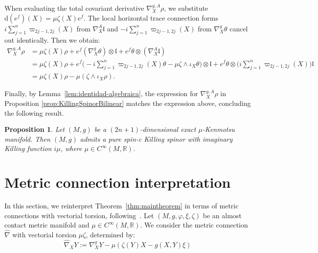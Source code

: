 \documentclass[10pt,a4paper,twoside,reqno]{amsart}
\theoremstyle{plain}
\newtheorem{prop}[thm]{Proposition}
\theoremstyle{definition}
\theoremstyle{remark}
\def\R{\mathbb{R}}
\def\dd{\mathrm{d}}
\def\R{\mathbb{R}}
\def\dd{\mathrm{d}}
\begin{document}
\noindent
When evaluating the total covariant derivative $\nabla^{g,A}_X \rho$, we substitute $\dd(e^f)(X) = \mu\zeta(X)e^f$. The local horizontal trace connection forms $i\sum_{j=1}^n \varpi_{2j-1, 2j}(X)$ from $\nabla^A_X \mathfrak{l}$ and $-i\sum_{j=1}^n \varpi_{2j-1, 2j}(X)$ from $\nabla^g_X \theta$ cancel out identically. Then we obtain:
\begin{align*}
\nabla^{g,A}_X\rho &= \mu\zeta(X)\rho + e^f(\nabla^g_X\theta)\otimes\mathfrak{l} + e^f\theta\otimes(\nabla^A_X\mathfrak{l})\\
&= \mu\zeta(X)\rho + e^f\Big(-i\sum_{j=1}^n\varpi_{2j-1,2j}(X)\theta - \mu\zeta\wedge\iota_X\theta\Big)\otimes\mathfrak{l} + e^f\theta\otimes\Big(i\sum_{j=1}^n\varpi_{2j-1,2j}(X)\Big)\mathfrak{l}\\
&= \mu\zeta(X)\rho - \mu(\zeta\wedge\iota_X\rho).
\end{align*}

\noindent
Finally, by Lemma~\ref{lem:identidad-algebraica}, the expression for $\nabla_{X}^{g,A}\rho$ in Proposition \ref{prop:KillingSpinorBilinear} matches the expression above, concluding the following result.

\begin{prop}
Let $(M,g)$ be a $(2n+1)$-dimensional exact $\mu$-Kenmotsu manifold. Then $(M,g)$ admits a pure spin-c Killing spinor with imaginary Killing function $i\mu$, where $\mu \in C^\infty(M, \mathbb{R})$.
\end{prop}


\section{Metric connection interpretation}
\label{sec:metric-connection-interpretation}


In this section, we reinterpret Theorem~\ref{thm:maintheorem} in terms of metric connections with vectorial torsion, following~\cite{C2026}. Let $(M,g,\varphi,\xi,\zeta)$ be an almost contact metric manifold and $\mu\in C^\infty(M,\R)$. We consider the metric connection $\hat\nabla$ with vectorial torsion $\mu\zeta$, determined by:
\begin{equation}
\label{eq:vectorial-connection}
    \hat\nabla_XY := \nabla^g_XY - \mu(\zeta(Y)X-g(X,Y)\xi)
\end{equation}
\end{document}
